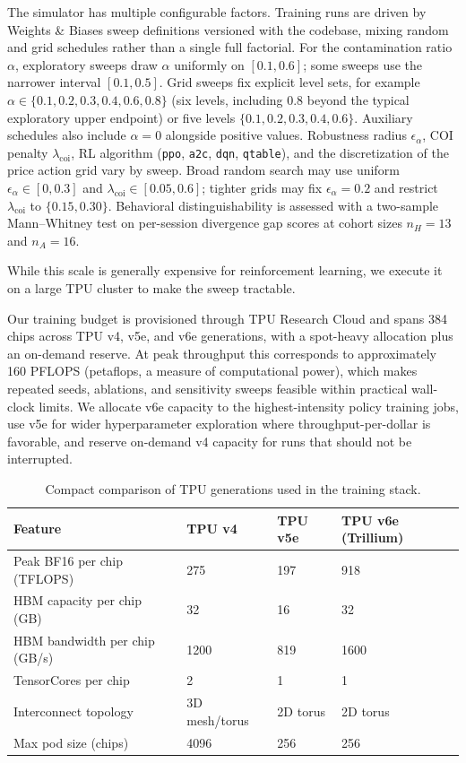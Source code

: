 The simulator has multiple configurable factors. Training runs are driven by Weights \& Biases sweep definitions versioned with the codebase, mixing random and grid schedules rather than a single full factorial. For the contamination ratio $\alpha$, exploratory sweeps draw $\alpha$ uniformly on $[0.1,0.6]$; some sweeps use the narrower interval $[0.1,0.5]$. Grid sweeps fix explicit level sets, for example $\alpha\in\{0.1,0.2,0.3,0.4,0.6,0.8\}$ (six levels, including $0.8$ beyond the typical exploratory upper endpoint) or five levels $\{0.1,0.2,0.3,0.4,0.6\}$. Auxiliary schedules also include $\alpha=0$ alongside positive values. Robustness radius $\epsilon_\alpha$, COI penalty $\lambda_\text{coi}$, RL algorithm (\texttt{ppo}, \texttt{a2c}, \texttt{dqn}, \texttt{qtable}), and the discretization of the price action grid vary by sweep. Broad random search may use uniform $\epsilon_\alpha\in[0,0.3]$ and $\lambda_\text{coi}\in[0.05,0.6]$; tighter grids may fix $\epsilon_\alpha=0.2$ and restrict $\lambda_\text{coi}$ to $\{0.15,0.30\}$. Behavioral distinguishability is assessed with a two-sample Mann--Whitney test on per-session divergence gap scores at cohort sizes $n_H=13$ and $n_A=16$.

While this scale is generally expensive for reinforcement learning, we execute it on a large TPU cluster to make the sweep tractable.

Our training budget is provisioned through TPU Research Cloud and spans 384 chips across TPU v4, v5e, and v6e generations, with a spot-heavy allocation plus an on-demand reserve. At peak throughput this corresponds to approximately 160 PFLOPS (petaflops, a measure of computational power), which makes repeated seeds, ablations, and sensitivity sweeps feasible within practical wall-clock limits. We allocate v6e capacity to the highest-intensity policy training jobs, use v5e for wider hyperparameter exploration where throughput-per-dollar is favorable, and reserve on-demand v4 capacity for runs that should not be interrupted.

\begin{table}[ht]
\centering
\caption{Compact comparison of TPU generations used in the training stack.}
\label{tab:tpu_specs}
\begin{tabular}{@{}llll@{}}
\toprule
\textbf{Feature} & \textbf{TPU v4} & \textbf{TPU v5e} & \textbf{TPU v6e (Trillium)} \\
\midrule
Peak BF16 per chip (TFLOPS) & 275 & 197 & 918 \\
HBM capacity per chip (GB) & 32 & 16 & 32 \\
HBM bandwidth per chip (GB/s) & 1200 & 819 & 1600 \\
TensorCores per chip & 2 & 1 & 1 \\
Interconnect topology & 3D mesh/torus & 2D torus & 2D torus \\
Max pod size (chips) & 4096 & 256 & 256 \\
\bottomrule
\end{tabular}
\end{table}

